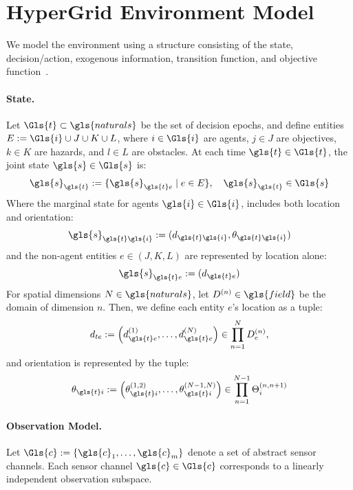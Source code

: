\section{HyperGrid Environment Model}
\label{con2:app:env_model}

We model the environment using a structure consisting of the state, 
decision/action, exogenous information, transition function, and 
objective function~\cite{powell2022}.

\paragraph{State.} 
Let \(\Gls{t} \subset \gls{naturals}\) be the set of decision epochs, 
and define entities \(E := \Gls{i}\cup J\cup K\cup L\), where 
\(i \in \Gls{i}\) are agents, 
\(j \in J\) are objectives, 
\(k \in K\) are hazards, and 
\(l \in L\) are obstacles. 
At each time \(\gls{t}\in\Gls{t}\), the joint state \(\gls{s}\in\Gls{s}\) is:
\[
    \gls{s}_{\gls{t}} := \{\gls{s}_{\gls{t}e} \mid e \in E\}, \quad \gls{s}_{\gls{t}} \in\Gls{s}
\]
Where the marginal state for agents \(\gls{i}\in\Gls{i}\), 
includes both location and orientation:
\[
    \gls{s}_{\gls{t}\gls{i}} := (d_{\gls{t}\gls{i}}, \theta_{\gls{t}\gls{i}})
\]
and the non-agent entities \(e \in (J, K, L)\) are represented by location alone:
\[
    \gls{s}_{\gls{t}e} := (d_{\gls{t}e})
\]
For spatial dimensions \(N\in\gls{naturals}\), %
let \(D^{(n)} \in\gls{field}\) be the domain of dimension \(n\).
Then, we define each entity \(e\)'s location as a tuple:
\[
    d_{te} := \left(d_{\gls{t}e}^{(1)},\ldots,d_{\gls{t}e}^{(N)}\right) 
        \in \prod_{n=1}^N D_e^{(n)},
\]
and orientation is represented by the tuple:
\[
    \theta_{\gls{t}i} := \left(\theta_{\gls{t}i}^{(1,2)},\ldots,
        \theta_{\gls{t}i}^{(N-1,N)}\right) \in \prod_{n=1}^{N-1} \Theta_i^{(n,n+1)}
\]

\paragraph{Observation Model.}
Let \(\Gls{c} := \{\gls{c}_1, \ldots, \gls{c}_m\}\) %
denote a set of abstract sensor channels. Each sensor channel 
\(\gls{c} \in \Gls{c}\) %
corresponds to a linearly independent observation subspace.

